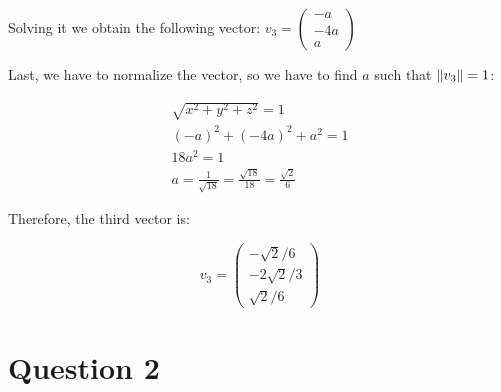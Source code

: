 \documentclass[12pt]{article}
\begin{document}
Solving it we obtain the following vector:
$
v_3 = 
\begin{pmatrix}
    -a \\
    -4a \\
    a
\end{pmatrix}
$

Last, we have to normalize the vector, so we have to find $a$ such that
$\norm{v_3} = 1$:

\begin{gather*}
\sqrt{x^2 + y^2 + z^2} = 1 \\
(-a)^2 + (-4a)^2 + a^2 = 1 \\
18a^2 = 1 \\
a = \frac{1}{\sqrt{18}} = \frac{\sqrt{18}}{18} = \frac{\sqrt{2}}{6}
\end{gather*}

Therefore, the third vector is:

\[ v_3 = 
\begin{pmatrix}
    -\sqrt{2}/6 \\ -2\sqrt{2}/3 \\ \sqrt{2}/6
\end{pmatrix}
\]

\section*{Question 2}
\end{document}
